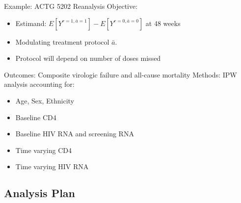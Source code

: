 \documentclass{beamer}
\begin{document}
    \begin{frame}{Example: ACTG 5202 Reanalysis}
            Objective:
        \begin{itemize}
            \item Estimand: $E\left[Y^{r=1,\bar{a}=1}\right]-E\left[Y^{r=0,\bar{a}=0}\right]$ at 48 weeks %
            \item Modulating treatment protocol $\bar{a}$.
            \item Protocol will depend on number of doses missed
        \end{itemize}
        \vspace{0.4cm}
        Outcomes: Composite virologic failure and all-cause mortality
        \vspace{0.4cm}
        Methods: IPW analysis accounting for:
            \begin{itemize}
                        \item Age, Sex, Ethnicity
                        \item Baseline CD4
                        \item Baseline HIV RNA and screening RNA
                        \item Time varying CD4
                        \item Time varying HIV RNA
            \end{itemize}
    \end{frame}

\subsection{Analysis Plan}
\end{document}

